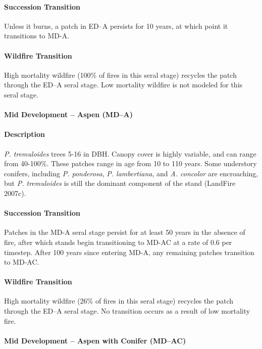 \paragraph{Succession Transition} Unless it burns, a patch in ED–A persists for 10 years, at which point it transitions to MD-A.

\paragraph{Wildfire Transition} High mortality wildfire (100\% of fires in this seral stage) recycles the patch through the ED–A seral stage. Low mortality wildfire is not modeled for this seral stage.

\noindent\hrulefill


\paragraph{Mid Development – Aspen (MD–A)}

\paragraph{Description} \emph{P. tremuloides} trees 5-16 in DBH. Canopy cover is highly variable, and can range from 40-100\%. These patches range in age from 10 to 110 years. Some understory conifers, including \emph{P. ponderosa}, \emph{P. lambertiana}, and \emph{A. concolor} are encroaching, but \emph{P. tremuloides} is still the dominant component of the stand (LandFire 2007c).

\paragraph{Succession Transition} Patches in the MD-A seral stage persist for at least 50 years in the absence of fire, after which stands begin transitioning to MD-AC at a rate of 0.6 per timestep. After 100 years since entering MD-A, any remaining patches transition to MD-AC. 

\paragraph{Wildfire Transition} High mortality wildfire (26\% of fires in this seral stage) recycles the patch through the ED–A seral stage. No transition occurs as a result of low mortality fire.

\noindent\hrulefill

\paragraph{Mid Development – Aspen with Conifer (MD–AC)}

